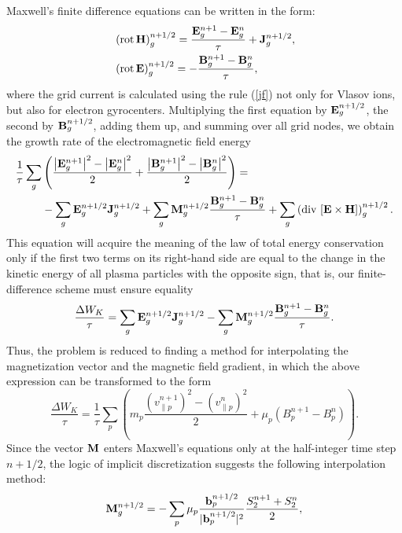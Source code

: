 \documentclass[final,3p]{elsarticle}
\newcommand{\rot}{\mbox{\rm{rot\,}}}
\newcommand{\diverg}{\mbox{\rm{div\,}}}
\begin{document}
Maxwell's finite difference equations can be written in the form:
\begin{align}
	&\left(\rot {\bf H}\right)_g^{n+1/2}=\frac{{\bf E}_g^{n+1}-{\bf E}_g^{n}}{\tau}+{\bf J}_g^{n+1/2}, \\
	&\left(\rot {\bf E}\right)_g^{n+1/2}=-\frac{{\bf B}_g^{n+1}-{\bf B}_g^{n}}{\tau},
\end{align}
where the grid current is calculated using the rule (\ref{jf}) not only for Vlasov ions, but also for electron gyrocenters. Multiplying the first equation by ${\bf E}_g^{n+1/2}$, the second by ${\bf B}_g^{n+1/2}$, adding them up, and summing over all grid nodes, we obtain the growth rate of the electromagnetic field energy
\begin{align}
	\frac{1}{\tau}\sum\limits_g &\left(\frac{\left|{\bf E}_g^{n+1}\right|^2-\left|{\bf E}_g^{n}\right|^2}{2}+\frac{\left|{\bf B}_g^{n+1}\right|^2-\left|{\bf B}_g^{n}\right|^2}{2}\right)= \nonumber \\ 
	&-\sum\limits_g {\bf E}_g^{n+1/2}{\bf J}_g^{n+1/2}+\sum\limits_g{\bf M}_g^{n+1/2}\frac{{\bf B}_g^{n+1}-{\bf B}_g^{n}}{\tau}+\sum\limits_g\left(\diverg \left[{\bf E}\times{\bf H}\right]\right)_g^{n+1/2}.
\end{align}
This equation will acquire the meaning of the law of total energy conservation only if the first two terms on its right-hand side are equal to the change in the kinetic energy of all plasma particles with the opposite sign, that is, our finite-difference scheme must ensure equality
\begin{equation}\label{kin_max}
	\frac{\Delta W_K}{\tau}=\sum\limits_g {\bf E}_g^{n+1/2}{\bf J}_g^{n+1/2}-\sum\limits_g{\bf M}_g^{n+1/2}\frac{{\bf B}_g^{n+1}-{\bf B}_g^{n}}{\tau}.
\end{equation}
Thus, the problem is reduced to finding a method for interpolating the magnetization vector and the magnetic field gradient, in which the above expression can be transformed to the form
\begin{equation}\label{kin2}
	\frac{\Delta W_K}{\tau}=\frac{1}{\tau}\sum\limits_p\left(m_p \frac{(v_{\|p}^{n+1})^2-(v_{\|p}^{n})^2}{2}+\mu_p \left(B_p^{n+1}-B_p^n\right)\right).
\end{equation} 
Since the vector ${\bf M}$ enters Maxwell's equations only at the half-integer time step $n+1/2$, the logic of implicit discretization suggests the following interpolation method:
\begin{equation}
	{\bf M}_g^{n+1/2}=-\sum\limits_p \mu_p \frac{{\bf b}_p^{n+1/2}}{|{\bf b}_p^{n+1/2}|^2} \frac{S_2^{n+1}+S_2^n}{2},\label{magn}
\end{equation}
\end{document}
